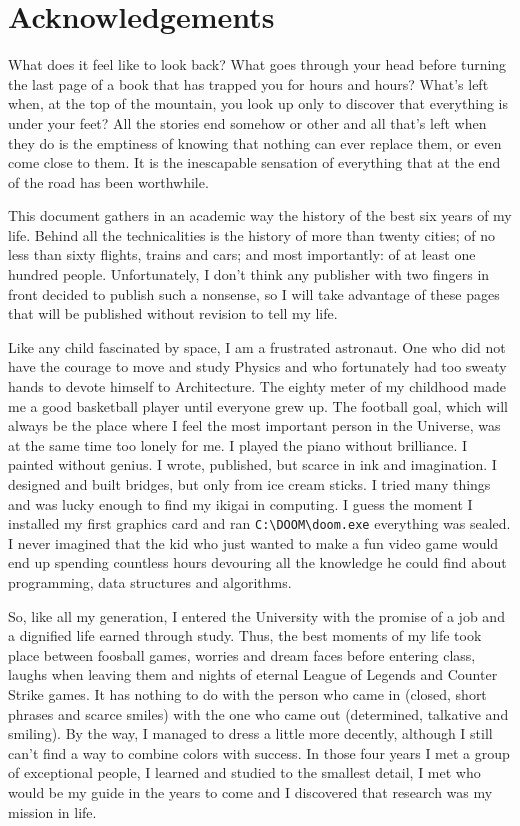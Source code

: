 \chapter{Acknowledgements}

What does it feel like to look back? What goes through your head before turning the last page of a book that has trapped you for hours and hours? What's left when, at the top of the mountain, you look up only to discover that everything is under your feet? All the stories end somehow or other and all that's left when they do is the emptiness of knowing that nothing can ever replace them, or even come close to them. It is the inescapable sensation of everything that at the end of the road has been worthwhile.

This document gathers in an academic way the history of the best six years of my life. Behind all the technicalities is the history of more than twenty cities; of no less than sixty flights, trains and cars; and most importantly: of at least one hundred people. Unfortunately, I don't think any publisher with two fingers in front decided to publish such a nonsense, so I will take advantage of these pages that will be published without revision to tell my life.

Like any child fascinated by space, I am a frustrated astronaut. One who did not have the courage to move and study Physics and who fortunately had too sweaty hands to devote himself to Architecture. The eighty meter of my childhood made me a good basketball player until everyone grew up. The football goal, which will always be the place where I feel the most important person in the Universe, was at the same time too lonely for me. I played the piano without brilliance. I painted without genius. I wrote, published, but scarce in ink and imagination. I designed and built bridges, but only from ice cream sticks. I tried many things and was lucky enough to find my ikigai in computing. I guess the moment I installed my first graphics card and ran \verb|C:\DOOM\doom.exe| everything was sealed. I never imagined that the kid who just wanted to make a fun video game would end up spending countless hours devouring all the knowledge he could find about programming, data structures and algorithms.

So, like all my generation, I entered the University with the promise of a job and a dignified life earned through study. Thus, the best moments of my life took place between foosball games, worries and dream faces before entering class, laughs when leaving them and nights of eternal League of Legends and Counter Strike games. It has nothing to do with the person who came in (closed, short phrases and scarce smiles) with the one who came out (determined, talkative and smiling). By the way, I managed to dress a little more decently, although I still can't find a way to combine colors with success. In those four years I met a group of exceptional people, I learned and studied to the smallest detail, I met who would be my guide in the years to come and I discovered that research was my mission in life.

